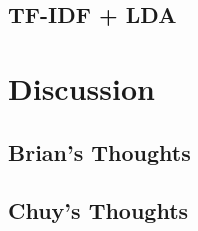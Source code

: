\documentclass[11pt]{article}
\begin{document}
\subsection{TF-IDF + LDA}
\label{sec:tfidf_lda}


\section{Discussion}
\label{sec:discussion}

\subsection{Brian's Thoughts}

\subsection{Chuy's Thoughts}

{}

\end{document}
